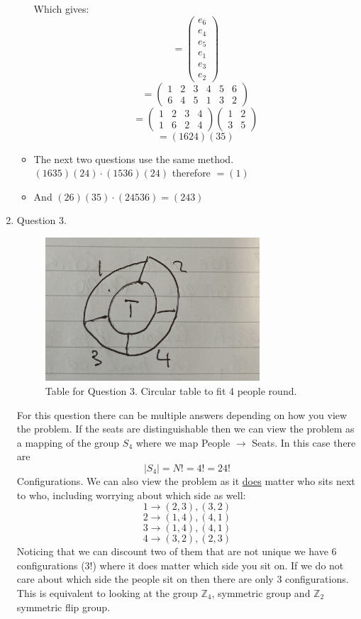 \documentclass[12pt]{article}
\begin{document}
\begin{enumerate}
\begin{itemize}
Which gives:
$$ =\left( \begin{array}{c} e_6 \\ e_4 \\ e_5 \\ e_1 \\ e_3 \\ e_2 \end{array}\right) $$
$$ =\left( \begin{array}{cccccc} 1 & 2 & 3 & 4 & 5&  6 \\ 6 & 4 & 5 & 1 & 3 & 2  \end{array}\right) $$
$$ =\left( \begin{array}{cccc} 1 & 2 & 3 & 4 \\ 1 & 6 & 2 & 4  \end{array}\right)  \left( \begin{array}{cc} 1 & 2 \\ 3 & 5  \end{array}\right) $$
$$ =(1624)(35) $$
\item  The next two questions use the same method. $ (1635)(24)\cdot(1536)(24) $ therefore $= (1) $
\item And $ (26)(35)\cdot(24536) = (243)$
\\
\end{itemize} 

\item Question 3.
\\
\begin{figure}[h]
\centering \includegraphics[width=8cm]{table.jpg}
\caption{Table for Question 3. Circular table to fit 4 people round. }
\end{figure}
For this question there can be multiple answers depending on how you view the problem. If the seats are distinguishable then we can view the problem as a mapping of the group $S_4$ where we map People $\rightarrow$ Seats. In this case there are 
$$ |S_4| = N! = 4! = 24! $$
Configurations. We can also view the problem as it \underline{does} matter who sits next to who, including worrying about which side as well:
$$ 1 \rightarrow (2,3),(3,2) $$
$$ 2 \rightarrow (1,4),(4,1) $$
$$ 3 \rightarrow (1,4),(4,1) $$ 
$$ 4 \rightarrow (3,2),(2,3) $$ 
Noticing that we can discount two of them that are not unique we have 6 configurations ($3!$) where it does matter which side you sit on. If we do not care about which side the people sit on then there are only 3 configurations. This is equivalent to looking at the group $\mathbb{Z}_4$, symmetric group and $\mathbb{Z}_2 $ symmetric flip group. 


\end{enumerate}
\end{document}
